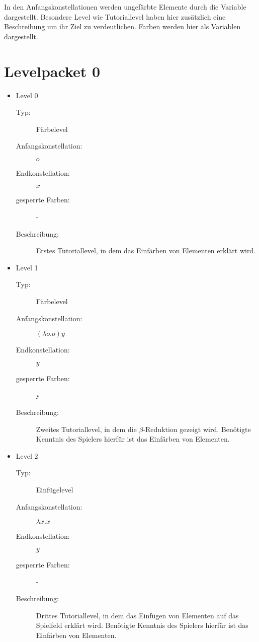 \documentclass[parskip=full]{scrreprt}
\begin{document}
In den Anfangskonstellationen werden ungefärbte Elemente durch die Variable  dargestellt. 
Besondere Level wie Tutoriallevel haben hier zusätzlich eine Beschreibung um ihr Ziel zu verdeutlichen.
Farben werden hier als Variablen dargestellt.

\chapter{Levelpacket 0}
\begin{itemize}
	\item{Level 0} 
		\begin{description}
			\item[Typ:] Färbelevel 
			\item[Anfangskonstellation:] \( o\)
			\item[Endkonstellation:] \( x\)
			\item[gesperrte Farben:] -  
			\item[Beschreibung:] Erstes Tutoriallevel, in dem das Einfärben von Elementen erklärt wird.
		\end{description}

	\item{Level 1} 
		\begin{description}
			\item[Typ:] Färbelevel 
			\item[Anfangskonstellation:] \((\lambda o . o ) y\)   
			\item[Endkonstellation:] \(y\) 
			\item[gesperrte Farben:] y 
			\item[Beschreibung:] Zweites Tutoriallevel, in dem die \(\beta\)-Reduktion gezeigt wird.
								Benötigte Kenntnis des Spielers hierfür ist das Einfärben von Elementen. 
		\end{description}

	\item{Level 2} 
		\begin{description}
			\item[Typ:] Einfügelevel 
			\item[Anfangskonstellation:] \(\lambda x . x \)   
			\item[Endkonstellation:] \(y\)
			\item[gesperrte Farben:] -  
			\item[Beschreibung:] Drittes Tutoriallevel, in dem das Einfügen von Elementen auf das Spielfeld erklärt wird.
								Benötigte Kenntnis des Spielers hierfür ist das Einfärben von Elementen. 
		\end{description}


\end{itemize}
\end{document}
